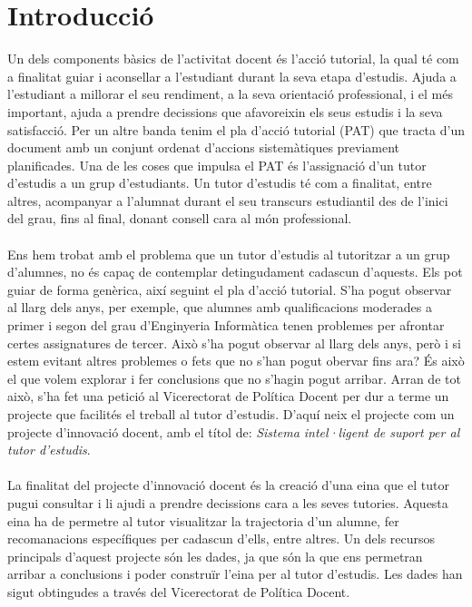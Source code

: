 \documentclass[12pt,a4paper,catalan]{article}
\begin{document}
\newpage 

\addto\captionsenglish{
  \renewcommand{\contentsname}%
    {Índex}%
}


{\hypersetup{linkcolor=black}
	\thispagestyle{empty}
	\tableofcontents
	\thispagestyle{empty}
}

\newpage

\setcounter{page}{1}


\section{Introducció}
Un dels components bàsics de l'activitat docent és l'acció tutorial, la qual té com a finalitat guiar i aconsellar a l'estudiant durant la seva etapa d'estudis. Ajuda a l'estudiant a millorar el seu rendiment, a la seva orientació professional, i el més important, ajuda a prendre decissions que afavoreixin els seus estudis i la seva satisfacció. Per un altre banda tenim el pla d'acció tutorial (PAT) que tracta d'un document amb un conjunt ordenat d'accions sistemàtiques previament planificades. Una de les coses que impulsa el PAT és l'assignació d'un tutor d'estudis a un grup d'estudiants. Un tutor d'estudis té com a finalitat, entre altres, acompanyar a l'alumnat durant el seu transcurs estudiantil des de l'inici del grau, fins al final, donant consell cara al món professional.
\\
\\
Ens hem trobat amb el problema que un tutor d'estudis al tutoritzar a un grup d'alumnes, no és capaç de contemplar detingudament cadascun d'aquests. Els pot guiar de forma genèrica, així seguint el pla d'acció tutorial. S'ha pogut observar al llarg dels anys, per exemple, que alumnes amb qualificacions moderades a primer i segon del grau d'Enginyeria Informàtica tenen problemes per afrontar certes assignatures de tercer. Això s'ha pogut observar al llarg dels anys, però i si estem evitant altres problemes o fets que no s'han pogut obervar fins ara? És això el que volem explorar i fer conclusions que no s'hagin pogut arribar. Arran de tot això, s'ha fet una petició al Vicerectorat de Política Docent per dur a terme un projecte que facilités el treball al tutor d'estudis. D'aquí neix el projecte com un projecte d'innovació docent, amb el títol de: \textit{Sistema intel·ligent de suport per al tutor d'estudis}.
\\
\\
La finalitat del projecte d'innovació docent és la creació d'una eina que el tutor pugui consultar i li ajudi a prendre decissions cara a les seves tutories. Aquesta eina ha de permetre al tutor visualitzar la trajectoria d'un alumne, fer recomanacions específiques per cadascun d'ells, entre altres. Un dels recursos principals d'aquest projecte són les dades, ja que són la que ens permetran arribar a conclusions i poder construïr l'eina per al tutor d'estudis. Les dades han sigut obtingudes a través del Vicerectorat de Política Docent.
\end{document}
